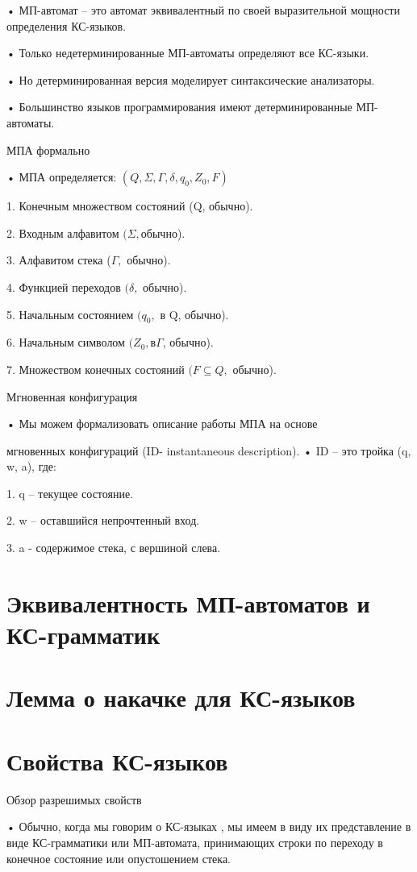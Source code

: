 \documentclass{article}
\begin{document}
• МП-автомат – это автомат эквивалентный по своей
выразительной мощности определения КС-языков.

• Только недетерминированные МП-автоматы определяют все
КС-языки.

• Но детерминированная версия моделирует синтаксические
анализаторы.

• Большинство языков программирования имеют детерминированные
МП-автоматы.


МПА формально

• МПА определяется: $(Q, \Sigma , \Gamma , \delta , q_0, Z_0, F)$

1. Конечным множеством состояний (Q, обычно).

2. Входным алфавитом $(\Sigma, $обычно).

3. Алфавитом стека ($\Gamma,$ обычно).

4. Функцией переходов $(\delta,$ обычно).

5. Начальным состоянием $(q_0,$ в Q, обычно).

6. Начальным символом $(Z_0, в \Gamma$, обычно).

7. Множеством конечных состояний $(F \subseteq  Q,$ обычно).

Мгновенная конфигурация

• Мы можем формализовать описание работы МПА на основе

мгновенных конфигураций (ID- instantaneous description).
• ID – это тройка (q, w, a), где:

1. q – текущее состояние.

2. w – оставшийся непрочтенный вход.

3. a - содержимое стека, с вершиной слева.

\section{Эквивалентность МП-автоматов и КС-грамматик}

\section{Лемма о накачке для КС-языков}


\section{Свойства КС-языков}

Обзор разрешимых свойств

• Обычно, когда мы говорим о КС-языках , мы имеем в виду их
представление в виде КС-грамматики или МП-автомата,
принимающих строки по переходу в конечное состояние или
опустошением стека.
\end{document}
